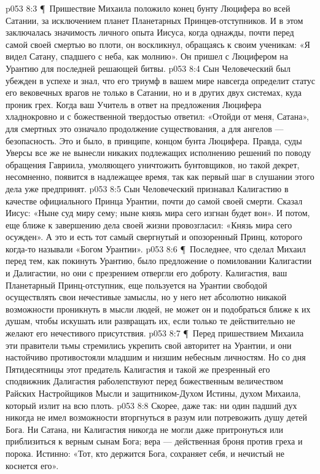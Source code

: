 \vs p053 8:3 \P\ Пришествие Михаила положило конец бунту Люцифера во всей Сатании, за исключением планет Планетарных Принцев\hyp{}отступников. И в этом заключалась значимость личного опыта Иисуса, когда однажды, почти перед самой своей смертью во плоти, он воскликнул, обращаясь к своим ученикам: «Я видел Сатану, спадшего с неба, как молнию». Он пришел с Люцифером на Урантию для последней решающей битвы.
\vs p053 8:4 Сын Человеческий был убежден в успехе и знал, что его триумф в вашем мире навсегда определит статус его вековечных врагов не только в Сатании, но и в других двух системах, куда проник грех. Когда ваш Учитель в ответ на предложения Люцифера хладнокровно и с божественной твердостью ответил: «Отойди от меня, Сатана», для смертных это означало продолжение существования, а для ангелов --- безопасность. Это и было, в принципе, концом бунта Люцифера. Правда, суды Уверсы все же не вынесли никаких подлежащих исполнению решений по поводу обращения Гавриила, умоляющего уничтожить бунтовщиков, но такой декрет, несомненно, появится в надлежащее время, так как первый шаг в слушании этого дела уже предпринят.
\vs p053 8:5 Сын Человеческий признавал Калигастию в качестве официального Принца Урантии, почти до самой своей смерти. Сказал Иисус: «Ныне суд миру сему; ныне князь мира сего изгнан будет вон». И потом, еще ближе к завершению дела своей жизни провозгласил: «Князь мира сего осужден». А это и есть тот самый свергнутый и опозоренный Принц, которого когда\hyp{}то называли «Богом Урантии».
\vs p053 8:6 \P\ Последнее, что сделал Михаил перед тем, как покинуть Урантию, было предложение о помиловании Калигастии и Далигастии, но они с презрением отвергли его доброту. Калигастия, ваш Планетарный Принц\hyp{}отступник, еще пользуется на Урантии свободой осуществлять свои нечестивые замыслы, но у него нет абсолютно никакой возможности проникнуть в мысли людей, не может он и подобраться ближе к их душам, чтобы искушать или развращать их, если только те действительно не желают его нечестивого присутствия.
\vs p053 8:7 \P\ Перед пришествием Михаила эти правители тьмы стремились укрепить свой авторитет на Урантии, и они настойчиво противостояли младшим и низшим небесным личностям. Но со дня Пятидесятницы этот предатель Калигастия и такой же презренный его сподвижник Далигастия раболепствуют перед божественным величеством Райских Настройщиков Мысли и защитником\hyp{}Духом Истины, духом Михаила, который излит на всю плоть.
\vs p053 8:8 Скорее, даже так: ни один падший дух никогда не имел возможности вторгнуться в разум или потревожить душу детей Бога. Ни Сатана, ни Калигастия никогда не могли даже притронуться или приблизиться к верным сынам Бога; вера --- действенная броня против греха и порока. Истинно: «Тот, кто держится Бога, сохраняет себя, и нечистый не коснется его».
